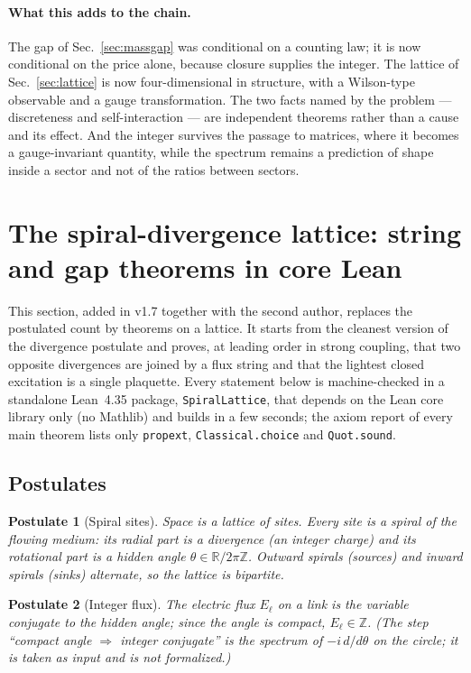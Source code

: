 \documentclass[aps,prd,preprint,superscriptaddress,amsmath,amssymb]{revtex4-2}
\newtheorem{postulate}{Postulate}[section]
\begin{document}
\paragraph{What this adds to the chain.}
The gap of Sec.~\ref{sec:massgap} was conditional on a counting law; it is
now conditional on the price alone, because closure supplies the integer.  The
lattice of Sec.~\ref{sec:lattice} is now four-dimensional in structure, with a
Wilson-type observable and a gauge transformation.  The two facts named by the
problem --- discreteness and self-interaction --- are independent theorems
rather than a cause and its effect.  And the integer survives the
passage to matrices, where it becomes a gauge-invariant quantity, while the
spectrum remains a prediction of shape inside a sector and not of the ratios
between sectors.

\section{The spiral-divergence lattice: string and gap theorems in core Lean}
\label{sec:spiral}

This section, added in v1.7 together with the second author, replaces the
postulated count by theorems on a lattice.  It starts from the cleanest
version of the divergence postulate and proves, at leading order in strong
coupling, that two opposite divergences are joined by a flux string and that
the lightest closed excitation is a single plaquette.  Every statement below
is machine-checked in a standalone Lean~4.35 package, \texttt{SpiralLattice},
that depends on the Lean core library only (no Mathlib) and builds in a few
seconds; the axiom report of every main theorem lists only
\texttt{propext}, \texttt{Classical.choice} and \texttt{Quot.sound}.

\subsection{Postulates}

\begin{postulate}[Spiral sites]
\label{post:spiral}
Space is a lattice of sites.  Every site is a spiral of the flowing medium:
its radial part is a divergence (an integer charge) and its rotational part
is a hidden angle $\theta\in\mathbb{R}/2\pi\mathbb{Z}$.  Outward spirals
(sources) and inward spirals (sinks) alternate, so the lattice is bipartite.
\end{postulate}

\begin{postulate}[Integer flux]
\label{post:intflux}
The electric flux $E_\ell$ on a link is the variable conjugate to the hidden
angle; since the angle is compact, $E_\ell\in\mathbb{Z}$.  (The step
``compact angle $\Rightarrow$ integer conjugate'' is the spectrum of
$-i\,d/d\theta$ on the circle; it is taken as input and is not formalized.)
\end{postulate}
\end{document}
